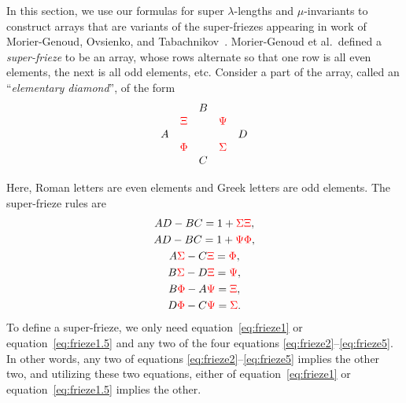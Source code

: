 \documentclass[pdftex]{sigma}
\numberwithin{equation}{section}
\newcommand{\s}[1]{{\color{red}#1}}
\begin{document}
In this section, we use our formulas for super $\lambda$-lengths and $\mu$-invariants to construct arrays that are variants
of the super-friezes appearing in work of Morier-Genoud, Ovsienko, and Tabachnikov~\cite{M-GOT15}.
Morier-Genoud et al.\ defined a \emph{super-frieze}
to be an array, whose rows alternate so that one row is all even elements, the next is all odd elements, etc. Consider a part of the array,
called an ``\emph{elementary diamond}'', of the form
\[\begin{array}{ccccc}
 & & B & & \\
 & \s{\Xi} & & \s{\Psi} & \\
 A & & & & D \\
 & \s{\Phi} & & \s{\Sigma} & \\
 & & C & &
 \end{array}
\]

Here, Roman letters are even elements and Greek letters are odd elements. The super-frieze rules are
\begin{gather}
AD-BC =1+ \s{\Sigma\Xi},\label{eq:frieze1}\\
AD-BC =1 + \s{\Psi}\s{\Phi},\label{eq:frieze1.5}\\
A\s{\Sigma }-C \s{\Xi} =\s{\Phi},\label{eq:frieze2}\\
B\s{\Sigma }-D \s{\Xi} =\s{\Psi},\label{eq:frieze3}\\
B\s{\Phi}-A\s{\Psi}=\s{\Xi},\label{eq:frieze4}\\
D\s{\Phi}-C\s{\Psi}=\s{\Sigma}.\label{eq:frieze5}
\end{gather}
To define a super-frieze, we only need equation~\eqref{eq:frieze1} or equation~\eqref{eq:frieze1.5} and any two of the four equations \eqref{eq:frieze2}--\eqref{eq:frieze5}. In other words, any two of equations \eqref{eq:frieze2}--\eqref{eq:frieze5} implies the other two, and utilizing these two equations, either of equation~\eqref{eq:frieze1} or equation~\eqref{eq:frieze1.5} implies the other.
\end{document}
